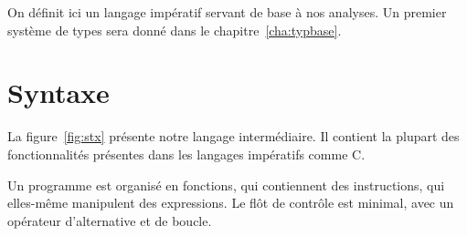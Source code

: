 On définit ici un langage impératif servant de base à nos analyses. Un premier
système de types sera donné dans le chapitre~\ref{cha:typbase}.

\section{Syntaxe}

La figure~\ref{fig:stx} présente notre langage intermédiaire. Il contient la
plupart des fonctionnalités présentes dans les langages impératifs comme C.

Un programme est organisé en fonctions, qui contiennent des instructions, qui
elles-même manipulent des expressions. Le flôt de contrôle est minimal, avec un
opérateur d'alternative et de boucle.

\begin{figure}





\end{figure}
